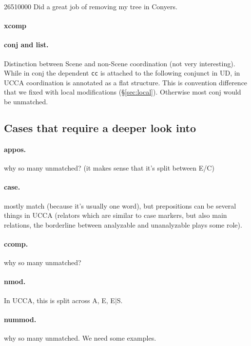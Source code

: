 \documentclass[11pt,a4paper]{article}
\begin{document}
26510000
Did a great job of removing my tree in Conyers.

\paragraph{xcomp}

\paragraph{conj and list.}
Distinction between Scene and non-Scene coordination (not very interesting).
While in conj the dependent \verb|cc| is attached to the following conjunct in UD,
in UCCA coordination is annotated as a flat structure.
This is convention difference that we fixed with local modifications (\S\ref{sec:local}).
Otherwise most conj would be unmatched.



\subsection{Cases that require a deeper look into}

\paragraph{appos.}
why so many unmatched? (it makes sense that it's split between E/C)

\paragraph{case.}
mostly match (because it's usually one word), but prepositions can be several things in UCCA (relators which are similar to case markers, but also main relations, the borderline between analyzable and unanalyzable plays some role).

\paragraph{ccomp.}
why so many unmatched?

\paragraph{nmod.}
In UCCA, this is split across A, E, E|S. 

\paragraph{nummod.}
why so many unmatched. We need some examples.
\end{document}

